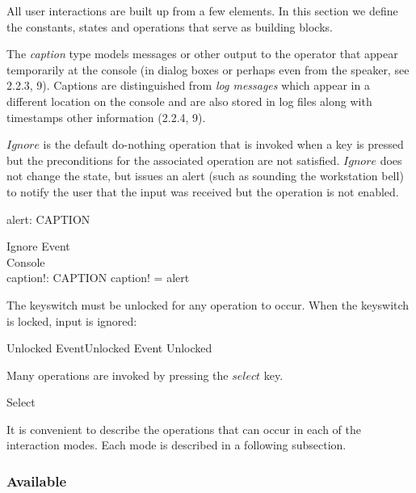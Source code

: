 \documentclass{article}
\begin{document}
All user interactions are built up from a few elements. In this
section we define the constants, states and operations that serve as
building blocks.

The {\em caption} type models messages or other output to the operator
that appear temporarily at the console (in dialog boxes or perhaps
even from the speaker, see 2.2.3, 9).  Captions are distinguished from
{\em log messages} which appear in a different location on the console
and are also stored in log files along with timestamps other
information (2.2.4, 9).

\begin{zed}\end{zed}
$Ignore$ is the default do-nothing operation that is
invoked when a key is pressed but the preconditions for the associated
operation are not satisfied.  $Ignore$ does not change the state, but
issues an alert (such as sounding the workstation bell) to notify the
user that the input was received but the operation is not enabled.  

\begin{axdef} alert: CAPTION \end{axdef}

\begin{schema}{Ignore}
	Event \\
	\Xi Console \\
	caption!: CAPTION
\where
	caption! = alert
\end{schema}
The keyswitch must be unlocked for any operation to occur.  When the keyswitch is
locked, input is ignored:

\begin{zed}	
	Unlocked 
\also
	EventUnlocked  Event \land Unlocked
\end{zed}
Many operations are invoked by pressing the $select$ key.

\begin{zed} 
	Select 
\end{zed}
It is convenient to describe the operations that can occur in each of
the interaction modes.  Each mode is described in a following
subsection.

\subsubsection{Available}
\end{document}
